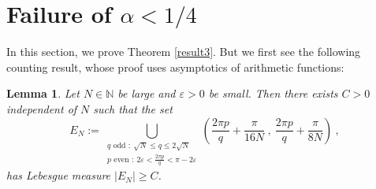 \documentclass[12pt]{amsart}
\newtheorem{lemma}[theorem]{Lemma}
\theoremstyle{definition}
\newcommand{\N}{\mathbb N}%
\numberwithin{equation}{section}
\begin{document}
\section{Failure of $\alpha <1/4$}
In this section, we prove Theorem \ref{result3}. But we first see the following counting result, whose proof uses asymptotics of arithmetic functions:
\begin{lemma} \label{counting_lemma}
Let $N \in \N$ be large and $\varepsilon>0$ be small. Then there exists $C>0$ independent of $N$ such that the set
\begin{equation} \label{set}
E_N := \bigcup_{\substack{q \text{ odd } :\: \sqrt{N} \le q \le 2\sqrt{N} \\ p \text{ even } :\:2\varepsilon < \frac{2\pi p}{q}<\pi - 2\varepsilon}} \left(\frac{2\pi p}{q}+\frac{\pi}{16N}\:,\:\frac{2\pi p}{q}+\frac{\pi}{8N}\right)\:,
\end{equation}
has Lebesgue measure $|E_N|\ge C$\:.
\end{lemma}
\end{document}
